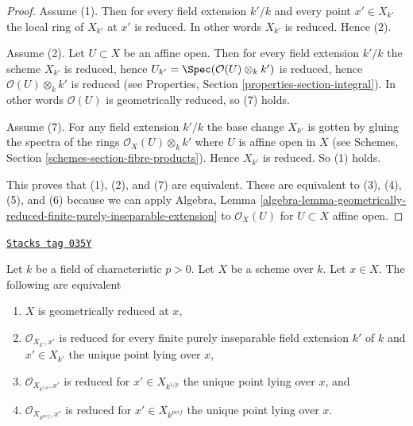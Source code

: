 \begin{proof}
Assume (1). Then for every field extension $k'/k$ and
every point $x' \in X_{k'}$ the local ring of $X_{k'}$ at $x'$
is reduced. In other words $X_{k'}$ is reduced. Hence (2).

\medskip\noindent
Assume (2). Let $U \subset X$ be an affine open. Then for
every field extension $k'/k$ the scheme $X_{k'}$ is reduced, hence
$U_{k'} = \Spec(\mathcal{O}(U)\otimes_k k')$ is reduced,
hence $\mathcal{O}(U)\otimes_k k'$ is reduced (see Properties,
Section \ref{properties-section-integral}). In other words
$\mathcal{O}(U)$ is geometrically reduced, so (7) holds.

\medskip\noindent
Assume (7). For any field extension $k'/k$ the base
change $X_{k'}$ is gotten by gluing the spectra of the
rings $\mathcal{O}_X(U) \otimes_k k'$ where $U$ is affine open
in $X$ (see Schemes, Section \ref{schemes-section-fibre-products}).
Hence $X_{k'}$ is reduced. So (1) holds.

\medskip\noindent
This proves that (1), (2), and (7) are equivalent. These are equivalent
to (3), (4), (5), and (6) because we can apply Algebra, Lemma
\ref{algebra-lemma-geometrically-reduced-finite-purely-inseparable-extension}
to $\mathcal{O}_X(U)$ for $U \subset X$ affine open.
\end{proof}

\begin{lemma}
\label{varieties-lemma-check-only-finite-inseparable-extensions}
\href{https://stacks.math.columbia.edu/tag/035Y}{\texttt{Stacks tag 035Y}}

Let $k$ be a field of characteristic $p > 0$. Let $X$ be a scheme over $k$.
Let $x \in X$. The following are equivalent
\begin{enumerate}
\item $X$ is geometrically reduced at $x$,
\item $\mathcal{O}_{X_{k'}, x'}$ is reduced for every
finite purely inseparable field extension $k'$ of $k$ and
$x' \in X_{k'}$ the unique point lying over $x$,
\item $\mathcal{O}_{X_{k^{1/p}}, x'}$ is reduced for
$x' \in X_{k^{1/p}}$ the unique point lying over $x$, and
\item $\mathcal{O}_{X_{k^{perf}}, x'}$ is reduced for
$x' \in X_{k^{perf}}$ the unique point lying over $x$.
\end{enumerate}
\end{lemma}

